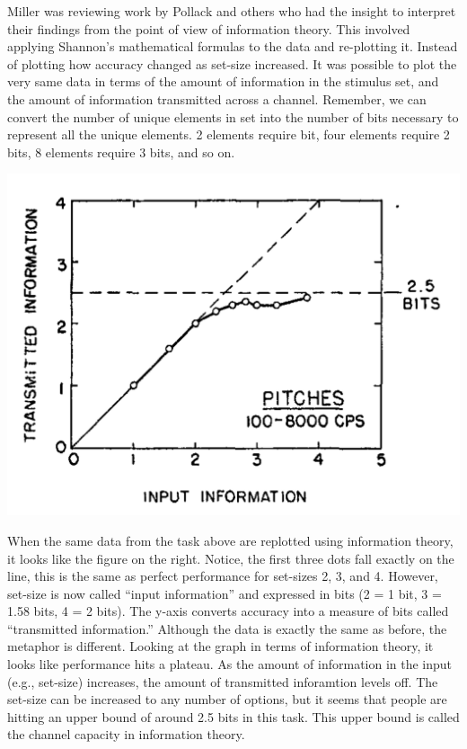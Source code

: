 \documentclass[
  oneside,
  12pt]{crumpbook}
\newenvironment{floatright50}{%
  \wrapfigure{R}{.5\textwidth}%
  }{%
  \endwrapfigure}
\begin{document}
Miller was reviewing work by Pollack and others who had the insight to interpret their findings from the point of view of information theory. This involved applying Shannon's mathematical formulas to the data and re-plotting it. Instead of plotting how accuracy changed as set-size increased. It was possible to plot the very same data in terms of the amount of information in the stimulus set, and the amount of information transmitted across a channel. Remember, we can convert the number of unique elements in set into the number of bits necessary to represent all the unique elements. 2 elements require bit, four elements require 2 bits, 8 elements require 3 bits, and so on.

\begin{floatright50}
\includegraphics[width=1\linewidth]{imgs/Miller_tone}

\end{floatright50}

When the same data from the task above are replotted using information theory, it looks like the figure on the right. Notice, the first three dots fall exactly on the line, this is the same as perfect performance for set-sizes 2, 3, and 4. However, set-size is now called ``input information'' and expressed in bits (2 = 1 bit, 3 = 1.58 bits, 4 = 2 bits). The y-axis converts accuracy into a measure of bits called ``transmitted information.'' Although the data is exactly the same as before, the metaphor is different. Looking at the graph in terms of information theory, it looks like performance hits a plateau. As the amount of information in the input (e.g., set-size) increases, the amount of transmitted inforamtion levels off. The set-size can be increased to any number of options, but it seems that people are hitting an upper bound of around 2.5 bits in this task. This upper bound is called the channel capacity in information theory.
\end{document}
